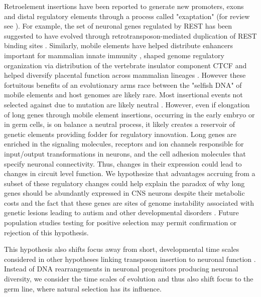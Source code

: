 Retroelement insertions have been reported to generate new promoters, exons and distal regulatory elements through a process called "exaptation" (for review see \cite{Chuong_2016}). For example, the set of neuronal genes regulated by REST has been suggested to have evolved through retrotransposon-mediated duplication of REST binding sites \citep{Johnson_2006}. Similarly, mobile elements have helped distribute enhancers important for mammalian innate immunity \cite{Chuong_2016a}, shaped genome regulatory organization via distribution of the vertebrate insulator component CTCF \citep{Schmidt_2012} and helped diversify placental function across mammalian lineages \citep{Chuong_2013}. However these fortuitous benefits of an evolutionary arms race between the "selfish DNA" of mobile elements and host genomes are likely rare. Most insertional events not selected against due to mutation are likely neutral \cite{Zhang_2011}. However, even if elongation of long genes through mobile element insertions, occurring in the early embryo or in germ cells, is on balance a neutral process, it likely creates a reservoir of genetic elements providing fodder for regulatory innovation. Long genes are enriched in the signaling molecules, receptors and ion channels responsible for input/output transformations in neurons, and the cell adhesion molecules that specify neuronal connectivity. Thus, changes in their expression could lead to changes in circuit level function. We hypothesize that advantages accruing from a subset of these regulatory changes could help explain the paradox of why long genes should be abundantly expressed in CNS neurons despite their metabolic costs and the fact that these genes are sites of genome instability associated with genetic lesions leading to autism and other developmental disorders \citep{Wei_2016}. Future population studies testing for positive selection may permit confirmation or rejection of this hypothesis.   


This hypothesis also shifts focus away from short, developmental time scales considered in other hypotheses linking transposon insertion to neuronal function \citep{Muotri_2005,Richardson_2014,Perrat_2013}. Instead of DNA rearrangements in neuronal progenitors producing neuronal diversity, we consider the time scales of evolution and thus also shift focus to the germ line, where natural selection has its influence. 



